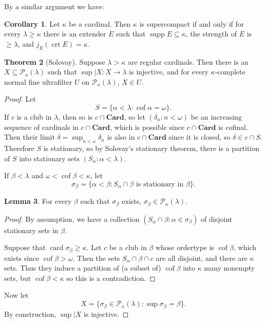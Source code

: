 \documentclass[12pt]{report}
\newcommand{\card}{\operatorname{card}}
\newcommand{\pset}{\mathcal{P}}
\newcommand{\supp}{\operatorname{supp}}
\newcommand{\Card}{\mathbf{Card}}
\DeclareMathOperator{\cof}{cof}
\DeclareMathOperator{\crt}{crt}
\theoremstyle{definition}
\newtheorem{theorem}{Theorem}[chapter]
\newtheorem{lemma}[theorem]{Lemma}
\newtheorem{corollary}[theorem]{Corollary}
\begin{document}
By a similar argument we have:
\begin{corollary}
Let $\kappa$ be a cardinal. Then $\kappa$ is supercompact if and only if for every $\lambda \geq \kappa$ there is an extender $E$ such that $\supp E \subseteq \kappa$, the strength of $E$ is $\geq \lambda$, and $j_E(\crt E) = \kappa$.
\end{corollary}

\begin{theorem}[Solovay]
Suppose $\lambda > \kappa$ are regular cardinals.
Then there is an $X \subseteq \pset_\kappa(\lambda)$ such that $\sup|X: X \to \lambda$ is injective, and for every $\kappa$-complete normal fine ultrafilter $U$ on $\pset_\kappa(\lambda)$, $X \in U$.
\end{theorem}
\begin{proof}
Let
$$S = \{\alpha < \lambda: \cof \alpha = \omega\}.$$
If $c$ is a club in $\lambda$, then so is $c \cap \Card$, so let $(\delta_n: n < \omega)$ be an increasing sequence of cardinals in $c \cap \Card$, which is possible since $c \cap \Card$ is cofinal.
Then their limit $\delta = \sup_{n < \omega} \delta_n$ is also in $c \cap \Card$ since it is closed, so $\delta \in c \cap S$.
Therefore $S$ is stationary, so by Solovay's stationary theorem, there is a partition of $S$ into stationary sets $(S_\alpha: \alpha < \lambda)$.

If $\beta < \lambda$ and $\omega < \cof \beta < \kappa$, let
$$\sigma_\beta = \{\alpha < \beta: S_\alpha \cap \beta \text{ is stationary in } \beta\}.$$
\begin{lemma}
For every $\beta$ such that $\sigma_\beta$ exists, $\sigma_\beta \in \pset_\kappa(\lambda)$.
\end{lemma}
\begin{proof}
By assumption, we have a collection $(S_\alpha \cap \beta: \alpha \in \sigma_\beta)$ of disjoint stationary sets in $\beta$.

Suppose that $\card \sigma_\beta \geq \kappa$. Let $c$ be a club in $\beta$ whose ordertype is $\cof \beta$, which exists since $\cof \beta > \omega$.
Then the sets $S_\alpha \cap \beta \cap c$ are all disjoint, and there are $\kappa$ sets. Thus they induce a partition of (a subset of) $\cof \beta$ into $\kappa$ many nonempty sets, but $\cof \beta < \kappa$ so this is a contradiction.
\end{proof}
Now let
$$X = \{\sigma_\beta \in \pset_\kappa(\lambda): \sup \sigma_\beta = \beta\}.$$
By construction, $\sup|X$ is injective.


\end{proof}
\end{document}
